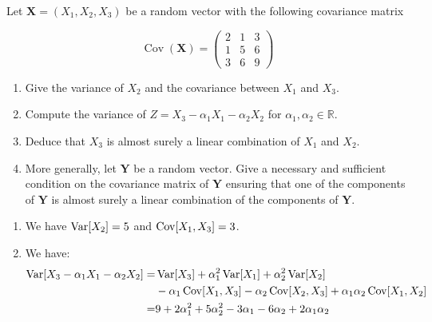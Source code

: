 \begin{Exercise}
  Let $\mathbf{X}=\left(X_{1}, X_{2}, X_{3}\right)$ be a random vector with the following covariance matrix

  \[
    \operatorname{Cov}(\mathbf{X})=\left(\begin{array}{lll}
        2 & 1 & 3 \\
        1 & 5 & 6 \\
        3 & 6 & 9
      \end{array}\right)
  \]

  \begin{enumerate}
    \item Give the variance of $X_{2}$ and the covariance between $X_{1}$ and $X_{3}$.

    \item Compute the variance of $Z=X_{3}-\alpha_{1} X_{1}-\alpha_{2} X_{2}$ for
          $\alpha_{1}, \alpha_{2} \in \mathbb{R}$.

    \item Deduce that $X_{3}$ is almost surely a linear combination of $X_{1}$ and
          $X_{2}$.

    \item More generally, let $\mathbf{Y}$ be a random vector. Give a necessary and
          sufficient condition on the covariance matrix of $\mathbf{Y}$ ensuring that one
          of the components of $\mathbf{Y}$ is almost surely a linear combination of the
          components of $\mathbf{Y}$.

  \end{enumerate}

\end{Exercise}


\begin{solution}
  \begin{enumerate}
    \item We have $\operatorname{Var}[X_2] = 5$ and $\operatorname{Cov}[X_1, X_3] = 3$.
    \item We have:
          \begin{align*}
            \operatorname{Var}[X_3 - \alpha_1 X_1 - \alpha_2 X_2] = & \operatorname{Var}[X_3] + \alpha_1^2 \operatorname{Var}[X_1] + \alpha_2^2 \operatorname{Var}[X_2]                                \\
                                                      & - \alpha_1 \operatorname{Cov}[X_1, X_3] - \alpha_2 \operatorname{Cov}[X_2, X_3] + \alpha_1 \alpha_2 \operatorname{Cov}[X_1, X_2] \\
            =                                         & 9 + 2\alpha_1^2 + 5\alpha_2^2 - 3\alpha_1 - 6 \alpha_2 + 2 \alpha_1 \alpha_2
          \end{align*}
  \end{enumerate}
\end{solution}